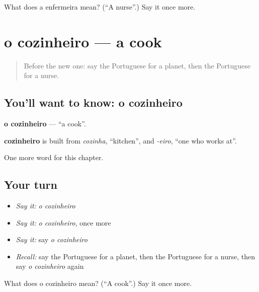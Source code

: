 \begin{tcolorbox}[breakable,colback=teal!4,colframe=teal!35!black,title={Before you move on}]
What does a enfermeira mean? (\textquotedblleft{}A nurse\textquotedblright{}.) Say it once more.
\end{tcolorbox}
\section[o cozinheiro]{o cozinheiro — a cook}

\label{lesson:PT-C110-cozinheiro}



\begin{quote}
Before the new one: say the Portuguese for a planet, then the Portuguese for a nurse.
\end{quote}

\subsection*{You'll want to know: o cozinheiro}
\textbf{o cozinheiro} — \textquotedblleft{}a cook\textquotedblright{}.

\begin{cousinweb}
\textbf{cozinheiro} is built from \emph{cozinha}, \textquotedblleft{}kitchen\textquotedblright{}, and \emph{-eiro}, \textquotedblleft{}one who works at\textquotedblright{}.
\end{cousinweb}

\begin{grammarlens}[title={What you've built}]
One more word for this chapter.
\end{grammarlens}

\subsection*{Your turn}
\begin{itemize}
\raggedright
  \item \emph{Say it:} \emph{o cozinheiro}
  \item \emph{Say it:} \emph{o cozinheiro}, once more
  \item \emph{Say it:} say \emph{o cozinheiro}
  \item \emph{Recall:} say the Portuguese for a planet, then the Portuguese for a nurse, then say \emph{o cozinheiro} again
\end{itemize}

\begin{tcolorbox}[breakable,colback=teal!4,colframe=teal!35!black,title={Before you move on}]
What does o cozinheiro mean? (\textquotedblleft{}A cook\textquotedblright{}.) Say it once more.
\end{tcolorbox}
